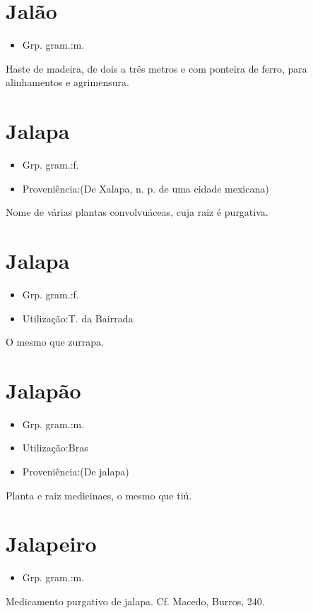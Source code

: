 \documentclass{article}
\begin{document}
\section{Jalão}
\begin{itemize}
\item {Grp. gram.:m.}
\end{itemize}
Haste de madeira, de dois a três metros e com ponteira de ferro, para alinhamentos e agrimensura.
\section{Jalapa}
\begin{itemize}
\item {Grp. gram.:f.}
\end{itemize}
\begin{itemize}
\item {Proveniência:(De \textunderscore Xalapa\textunderscore , n. p. de uma cidade mexicana)}
\end{itemize}
Nome de várias plantas convolvuáceas, cuja raiz é purgativa.
\section{Jalapa}
\begin{itemize}
\item {Grp. gram.:f.}
\end{itemize}
\begin{itemize}
\item {Utilização:T. da Bairrada}
\end{itemize}
O mesmo que \textunderscore zurrapa\textunderscore .
\section{Jalapão}
\begin{itemize}
\item {Grp. gram.:m.}
\end{itemize}
\begin{itemize}
\item {Utilização:Bras}
\end{itemize}
\begin{itemize}
\item {Proveniência:(De \textunderscore jalapa\textunderscore )}
\end{itemize}
Planta e raiz medicinaes, o mesmo que \textunderscore tiú\textunderscore .
\section{Jalapeiro}
\begin{itemize}
\item {Grp. gram.:m.}
\end{itemize}
Medicamento purgativo de jalapa. Cf. Macedo, \textunderscore Burros\textunderscore , 240.
\end{document}
